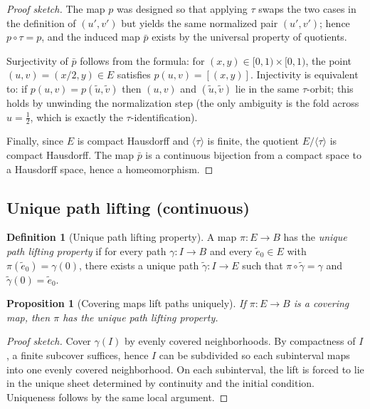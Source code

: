 \documentclass[11pt,a4paper]{article}
\newtheorem{proposition}[theorem]{Proposition}
\theoremstyle{definition}
\newtheorem{definition}[theorem]{Definition}
\theoremstyle{remark}
\begin{document}
\begin{proof}[Proof sketch]
The map \(p\) was designed so that applying \(\tau\) swaps the two cases in the definition of \((u',v')\) but yields the same normalized pair \((u',v')\); hence \(p\circ\tau=p\), and the induced map \(\bar p\) exists by the universal property of quotients.

Surjectivity of \(\bar p\) follows from the formula: for \((x,y)\in[0,1)\times[0,1)\), the point \((u,v)=(x/2,y)\in E\) satisfies \(p(u,v)=[(x,y)]\). Injectivity is equivalent to: if \(p(u,v)=p(\tilde u,\tilde v)\) then \((u,v)\) and \((\tilde u,\tilde v)\) lie in the same \(\tau\)-orbit; this holds by unwinding the normalization step (the only ambiguity is the fold across \(u=\tfrac12\), which is exactly the \(\tau\)-identification).

Finally, since \(E\) is compact Hausdorff and \(\langle\tau\rangle\) is finite, the quotient \(E/\langle\tau\rangle\) is compact Hausdorff. The map \(\bar p\) is a continuous bijection from a compact space to a Hausdorff space, hence a homeomorphism.
\end{proof}

\subsection{Unique path lifting (continuous)}
\label{sec:upl-continuous}

\begin{definition}[Unique path lifting property]
\label{def:upl}
A map \(\pi:E\to B\) has the \emph{unique path lifting property} if for every path \(\gamma:I\to B\) and every \(\tilde e_0\in E\) with \(\pi(\tilde e_0)=\gamma(0)\), there exists a unique path \(\tilde\gamma:I\to E\) such that \(\pi\circ\tilde\gamma=\gamma\) and \(\tilde\gamma(0)=\tilde e_0\).
\end{definition}

\begin{proposition}[Covering maps lift paths uniquely]
\label{prop:cover-upl}
If \(\pi:E\to B\) is a covering map, then \(\pi\) has the unique path lifting property.
\end{proposition}

\begin{proof}[Proof sketch]
Cover \(\gamma(I)\) by evenly covered neighborhoods. By compactness of \(I\), a finite subcover suffices, hence \(I\) can be subdivided so each subinterval maps into one evenly covered neighborhood. On each subinterval, the lift is forced to lie in the unique sheet determined by continuity and the initial condition. Uniqueness follows by the same local argument.
\end{proof}
\end{document}
